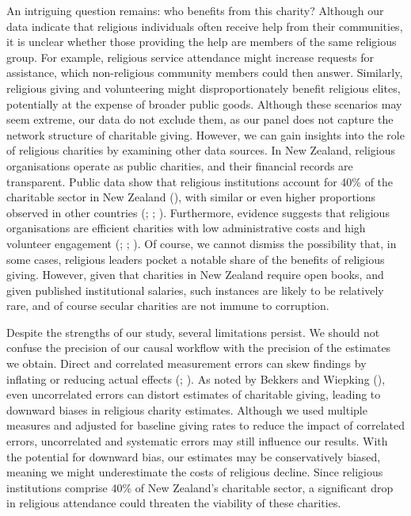 \documentclass[
  single column]{article}
\begin{document}
An intriguing question remains: who benefits from this charity? Although
our data indicate that religious individuals often receive help from
their communities, it is unclear whether those providing the help are
members of the same religious group. For example, religious service
attendance might increase requests for assistance, which non-religious
community members could then answer. Similarly, religious giving and
volunteering might disproportionately benefit religious elites,
potentially at the expense of broader public goods. Although these
scenarios may seem extreme, our data do not exclude them, as our panel
does not capture the network structure of charitable giving. However, we
can gain insights into the role of religious charities by examining
other data sources. In New Zealand, religious organisations operate as
public charities, and their financial records are transparent. Public
data show that religious institutions account for 40\% of the charitable
sector in New Zealand (),
with similar or even higher proportions observed in other countries
(;
;
).
Furthermore, evidence suggests that religious organisations are
efficient charities with low administrative costs and high volunteer
engagement (; ;
). Of course, we cannot
dismiss the possibility that, in some cases, religious leaders pocket a
notable share of the benefits of religious giving. However, given that
charities in New Zealand require open books, and given published
institutional salaries, such instances are likely to be relatively rare,
and of course secular charities are not immune to corruption.

Despite the strengths of our study, several limitations persist. We
should not confuse the precision of our causal workflow with the
precision of the estimates we obtain. Direct and correlated measurement
errors can skew findings by inflating or reducing actual effects
(;
).
As noted by Bekkers and Wiepking
(), even
uncorrelated errors can distort estimates of charitable giving, leading
to downward biases in religious charity estimates. Although we used
multiple measures and adjusted for baseline giving rates to reduce the
impact of correlated errors, uncorrelated and systematic errors may
still influence our results. With the potential for downward bias, our
estimates may be conservatively biased, meaning we might underestimate
the costs of religious decline. Since religious institutions comprise
40\% of New Zealand's charitable sector, a significant drop in religious
attendance could threaten the viability of these charities.
\end{document}
